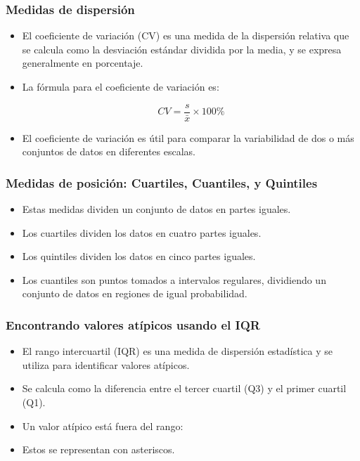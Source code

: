 \documentclass[aspectratio=169]{beamer}
\begin{document}
\begin{frame}
\frametitle{Medidas de dispersión}

\begin{itemize}

\item El coeficiente de variación (CV) es una medida de la dispersión relativa que se calcula como la desviación estándar dividida por la media, y se expresa generalmente en porcentaje. 

\item La fórmula para el coeficiente de variación es:

\[
CV = \frac{s}{\bar{x}} \times 100\%
\]

\item El coeficiente de variación es útil para comparar la variabilidad de dos o más conjuntos de datos en diferentes escalas.
\end{itemize}


\end{frame}





\begin{frame}
\frametitle{Medidas de posición: Cuartiles, Cuantiles, y Quintiles}

\begin{itemize}
    \item Estas medidas dividen un conjunto de datos en partes iguales.
    \item Los cuartiles dividen los datos en cuatro partes iguales.
    \item Los quintiles dividen los datos en cinco partes iguales.
    \item Los cuantiles son puntos tomados a intervalos regulares, dividiendo un conjunto de datos en regiones de igual probabilidad.
\end{itemize}

\end{frame}

\begin{frame}
\frametitle{Encontrando valores atípicos usando el IQR}

\begin{itemize}
    \item El rango intercuartil (IQR) es una medida de dispersión estadística y se utiliza para identificar valores atípicos.
    \item Se calcula como la diferencia entre el tercer cuartil (Q3) y el primer cuartil (Q1).
    \item Un valor atípico está fuera del rango: 
    \begin{equation*}
    [Q1 - 1.5 \times IQR, Q3 + 1.5 \times IQR]
    \end{equation*}
    \item Estos se representan con asteriscos.
\end{itemize}

\end{frame}
\end{document}
